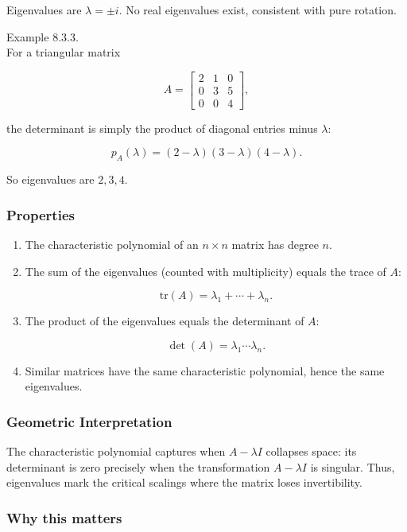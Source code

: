 \documentclass[
  12pt,
  a4paper,
]{article}
\begin{document}
Eigenvalues are \(\lambda = \pm i\). No real eigenvalues exist,
consistent with pure rotation.

Example 8.3.3.\\
For a triangular matrix

\[A = \begin{bmatrix} 2 & 1 & 0 \\ 0 & 3 & 5 \\ 0 & 0 & 4 \end{bmatrix},\]

the determinant is simply the product of diagonal entries minus
\(\lambda\):

\[p_A(\lambda) = (2-\lambda)(3-\lambda)(4-\lambda).\]

So eigenvalues are \(2, 3, 4\).

\subsubsection{Properties}\label{properties-2}

\begin{enumerate}
\def\labelenumi{\arabic{enumi}.}
\item
  The characteristic polynomial of an \(n \times n\) matrix has degree
  \(n\).
\item
  The sum of the eigenvalues (counted with multiplicity) equals the
  trace of \(A\):

  \[\text{tr}(A) = \lambda_1 + \cdots + \lambda_n.\]
\item
  The product of the eigenvalues equals the determinant of \(A\):

  \[\det(A) = \lambda_1 \cdots \lambda_n.\]
\item
  Similar matrices have the same characteristic polynomial, hence the
  same eigenvalues.
\end{enumerate}

\subsubsection{Geometric
Interpretation}\label{geometric-interpretation-18}

The characteristic polynomial captures when \(A - \lambda I\) collapses
space: its determinant is zero precisely when the transformation
\(A - \lambda I\) is singular. Thus, eigenvalues mark the critical
scalings where the matrix loses invertibility.

\subsubsection{Why this matters}\label{why-this-matters-30}
\end{document}
